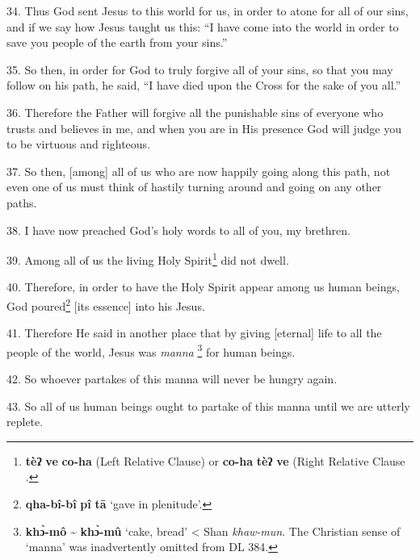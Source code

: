 34. Thus God sent Jesus to this world for us, in order to atone for all of our
sins, and if we say how Jesus taught us this: ``I have come into the world in order
to save you people of the earth from your sins.''

35. So then, in order for God to truly forgive all of your sins, so that you may
follow on his path, he said, ``I have died upon the Cross for the sake of you all.''

36. Therefore the Father will forgive all the punishable sins of everyone who trusts
and believes in me, and when you are in His presence God will judge you to be virtuous
and righteous.

37. So then, [among] all of us who are now happily going along this path, not even
one of us must think of hastily turning around and going on any other paths.

38. I have now preached God's holy words to all of you, my brethren.

39. Among all of us the living Holy Spirit\footnote{\textbf{tèʔ} \textbf{ve} \textbf{co-ha} (Left Relative Clause) or \textbf{co-ha} \textbf{tèʔ} \textbf{ve} (Right Relative Clause .} did not dwell.

40. Therefore, in order to have the Holy Spirit appear among us human beings, God
poured\footnote{\textbf{qha-bî-bî} \textbf{pî} \textbf{tā} `gave in plenitude'.} [its essence] into his Jesus.

41. Therefore He said in another place that by giving [eternal] life to all the
people of the world, Jesus was \textit{manna }\footnote{\textbf{khɔ̀-mô} \textasciitilde{ \textbf{khɔ̀-mû} }`cake, bread' < Shan \textit{khaw-mun}. The Christian sense of `manna' was inadvertently omitted from DL 384.} for human beings.

42. So whoever partakes of this manna will never be hungry again.

43. So all of us human beings ought to partake of this manna until we are utterly replete.

